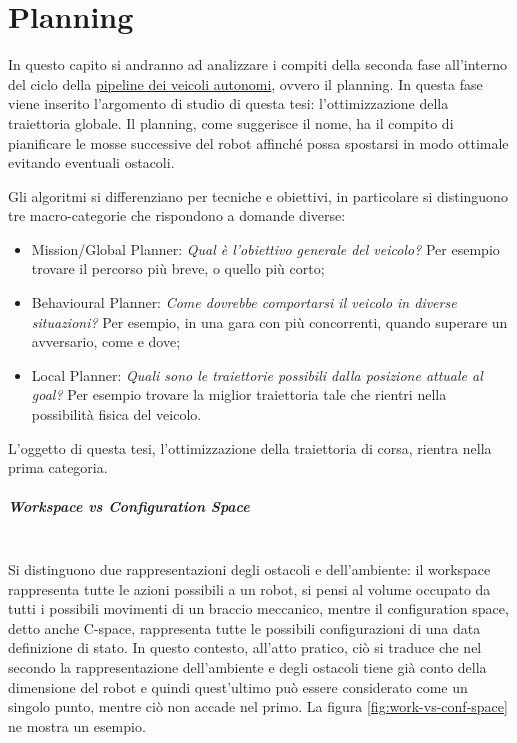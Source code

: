 
\chapter{Planning}
\label{chap:plan}

In questo capito si andranno ad analizzare i compiti della seconda fase all'interno del ciclo della
\hyperref[sec:pipeline]{pipeline dei veicoli autonomi}, ovvero il planning. In questa fase viene inserito
l'argomento di studio di questa tesi: l'ottimizzazione della traiettoria globale.
Il planning, come suggerisce il nome, ha il compito di pianificare le mosse successive del robot affinché
possa spostarsi in modo ottimale evitando eventuali ostacoli.

\bigskip
\noindent Gli algoritmi si differenziano per tecniche e obiettivi, in particolare si distinguono tre
macro-categorie che rispondono a domande diverse:
\begin{itemize}
	\item Mission/Global Planner: \textit{Qual è l'obiettivo generale del veicolo?} Per esempio trovare
	il percorso più breve, o quello più corto; 
	\item Behavioural Planner: \textit{Come dovrebbe comportarsi il veicolo in diverse situazioni?} Per
	esempio, in una gara con più concorrenti, quando superare un avversario, come e dove;
	\item Local Planner: \textit{Quali sono le traiettorie possibili dalla posizione attuale al goal?}
	Per esempio trovare la miglior traiettoria tale che rientri nella possibilità fisica del veicolo.
\end{itemize}
L'oggetto di questa tesi, l'ottimizzazione della traiettoria di corsa, rientra nella prima categoria.


\paragraph{\textit{Workspace} vs \textit{Configuration Space}} \ \\
Si distinguono due rappresentazioni degli ostacoli e dell'ambiente: il workspace rappresenta tutte le
azioni possibili a un robot, si pensi al volume occupato da tutti i possibili movimenti di un braccio
meccanico, mentre il configuration space, detto anche C-space, rappresenta tutte le possibili
configurazioni di una data definizione di stato. In questo contesto, all'atto pratico, ciò si traduce che
nel secondo la rappresentazione dell'ambiente e degli ostacoli tiene già conto della dimensione del
robot e quindi quest'ultimo può essere considerato come un singolo punto, mentre ciò non accade nel
primo. La figura \ref{fig:work-vs-conf-space} ne mostra un esempio.

